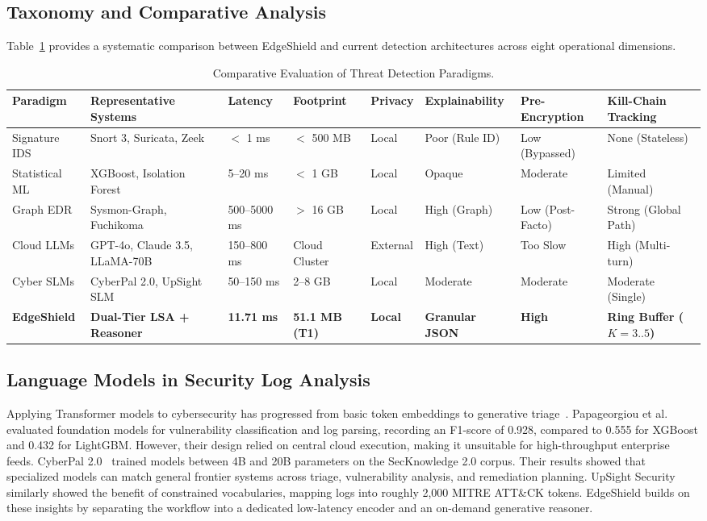 \documentclass[10pt,journal,compsoc]{IEEEtran}
\begin{document}
\subsection{Taxonomy and Comparative Analysis}
Table~\ref{tab:comparison} provides a systematic comparison between EdgeShield and current detection architectures across eight operational dimensions.

\begin{table}[t]
\centering
\caption{Comparative Evaluation of Threat Detection Paradigms.}
\label{tab:comparison}
\begin{tabular}{llllllll}
\toprule
\textbf{Paradigm} & \textbf{Representative Systems} & \textbf{Latency} & \textbf{Footprint} & \textbf{Privacy} & \textbf{Explainability} & \textbf{Pre-Encryption} & \textbf{Kill-Chain Tracking} \\
\midrule
Signature IDS & Snort 3, Suricata, Zeek & $<$ 1 ms & $<$ 500 MB & Local & Poor (Rule ID) & Low (Bypassed) & None (Stateless) \\
Statistical ML & XGBoost, Isolation Forest & 5--20 ms & $<$ 1 GB & Local & Opaque & Moderate & Limited (Manual) \\
Graph EDR & Sysmon-Graph, Fuchikoma & 500--5000 ms & $>$ 16 GB & Local & High (Graph) & Low (Post-Facto) & Strong (Global Path) \\
Cloud LLMs & GPT-4o, Claude 3.5, LLaMA-70B & 150--800 ms & Cloud Cluster & External & High (Text) & Too Slow & High (Multi-turn) \\
Cyber SLMs & CyberPal 2.0, UpSight SLM & 50--150 ms & 2--8 GB & Local & Moderate & Moderate & Moderate (Single) \\
\textbf{EdgeShield} & \textbf{Dual-Tier LSA + Reasoner} & \textbf{11.71 ms} & \textbf{51.1 MB (T1)} & \textbf{Local} & \textbf{Granular JSON} & \textbf{High} & \textbf{Ring Buffer ($K=3..5$)} \\
\bottomrule
\end{tabular}
\end{table}

\subsection{Language Models in Security Log Analysis}
Applying Transformer models to cybersecurity has progressed from basic token embeddings to generative triage~\cite{ferrag2024, lu2025acl}. Papageorgiou et al.~\cite{papageorgiou2025} evaluated foundation models for vulnerability classification and log parsing, recording an F1-score of 0.928, compared to 0.555 for XGBoost and 0.432 for LightGBM. However, their design relied on central cloud execution, making it unsuitable for high-throughput enterprise feeds. CyberPal 2.0~\cite{tihanyi2025} trained models between 4B and 20B parameters on the SecKnowledge 2.0 corpus. Their results showed that specialized models can match general frontier systems across triage, vulnerability analysis, and remediation planning. UpSight Security~\cite{upsight2024} similarly showed the benefit of constrained vocabularies, mapping logs into roughly 2,000 MITRE ATT\&CK tokens. EdgeShield builds on these insights by separating the workflow into a dedicated low-latency encoder and an on-demand generative reasoner.
\end{document}
